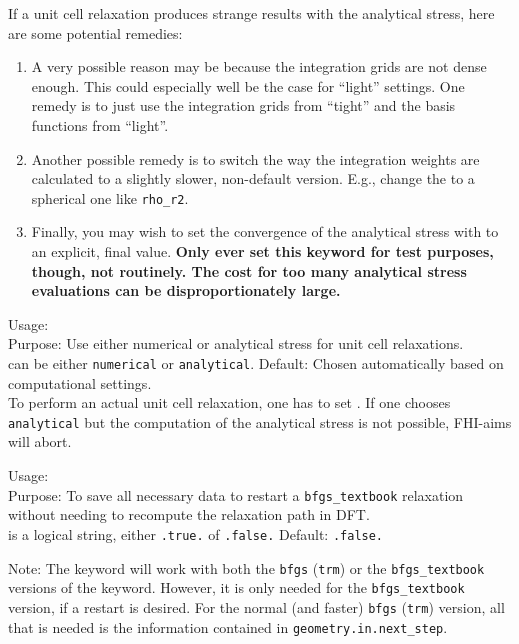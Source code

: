 If a unit cell relaxation produces strange results with the analytical
stress, here are some potential remedies:
\begin{enumerate}
  \item A very possible reason may be because the integration grids
    are not dense enough. This could especially well be the case for
    ``light'' settings. One remedy is to just use the integration
    grids from ``tight'' and the basis functions from ``light''. 
  \item Another possible remedy is to switch the way the integration
    weights are calculated to a slightly slower, non-default
    version. E.g., change the  to a spherical
    one like \texttt{rho\_r2}. 
  \item Finally, you may wish to set the convergence of the analytical
    stress with  to an explicit, final
    value. \textbf{Only ever set this keyword for test purposes,
    though, not routinely. The cost for too many analytical stress
    evaluations can be disproportionately large.}
\end{enumerate}

{
  \noindent
  Usage:   \\[1.0ex]
  Purpose: Use either numerical or analytical stress for unit cell
  relaxations.\\[1.0ex] 
   can be either \texttt{numerical} or
    \texttt{analytical}. Default: Chosen automatically based on computational
    settings. \\
}
To perform an actual unit cell relaxation, one has to set
. If one chooses \texttt{analytical} but the 
computation of the analytical stress is not possible, FHI-aims will abort.

{
  \noindent
  Usage:  
    \\[1.0ex]
  Purpose: To save all necessary data to restart a \texttt{bfgs\_textbook}
    relaxation without needing to recompute the relaxation path in
    DFT. \\[1.0ex] 
  is a logical string, either \texttt{.true.} of
 \texttt{.false.} Default: \texttt{.false.} \\
}

Note: The  keyword will work with both
the \texttt{bfgs} (\texttt{trm}) or the \texttt{bfgs\_textbook}
versions of the  keyword. However, it is only
needed for the \texttt{bfgs\_textbook} version, if a restart is
desired. For the normal (and faster) \texttt{bfgs} (\texttt{trm})
version, all that is needed is the information contained in
\texttt{geometry.in.next\_step}. 

